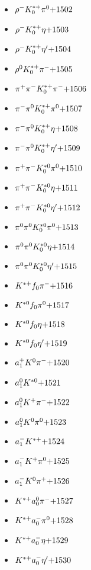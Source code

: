 \begin{multicols}{3}
\begin{itemize}
 \item $ \rho^{-} K_{0}^{*+} \pi^{0} \hfill{+1502}$
 \item $ \rho^{-} K_{0}^{*+} \eta \hfill{+1503}$
 \item $ \rho^{-} K_{0}^{*+} {\eta^{\prime}} \hfill{+1504}$
 \item $ \rho^{0} K_{0}^{*+} \pi^{-} \hfill{+1505}$
 \item $ \pi^{+} \pi^{-} K_{0}^{*+} \pi^{-} \hfill{+1506}$
 \item $ \pi^{-} \pi^{0} K_{0}^{*+} \pi^{0} \hfill{+1507}$
 \item $ \pi^{-} \pi^{0} K_{0}^{*+} \eta \hfill{+1508}$
 \item $ \pi^{-} \pi^{0} K_{0}^{*+} {\eta^{\prime}} \hfill{+1509}$
 \item $ \pi^{+} \pi^{-} K_{0}^{*0} \pi^{0} \hfill{+1510}$
 \item $ \pi^{+} \pi^{-} K_{0}^{*0} \eta \hfill{+1511}$
 \item $ \pi^{+} \pi^{-} K_{0}^{*0} {\eta^{\prime}} \hfill{+1512}$
 \item $ \pi^{0} \pi^{0} K_{0}^{*0} \pi^{0} \hfill{+1513}$
 \item $ \pi^{0} \pi^{0} K_{0}^{*0} \eta \hfill{+1514}$
 \item $ \pi^{0} \pi^{0} K_{0}^{*0} {\eta^{\prime}} \hfill{+1515}$
 \item $ K^{*+} f_{0} \pi^{-} \hfill{+1516}$
 \item $ K^{*0} f_{0} \pi^{0} \hfill{+1517}$
 \item $ K^{*0} f_{0} \eta \hfill{+1518}$
 \item $ K^{*0} f_{0} {\eta^{\prime}} \hfill{+1519}$
 \item $ a_{1}^{+} K^{0} \pi^{-} \hfill{+1520}$
 \item $ a_{1}^{0} K^{*0} \hfill{+1521}$
 \item $ a_{1}^{0} K^{+} \pi^{-} \hfill{+1522}$
 \item $ a_{1}^{0} K^{0} \pi^{0} \hfill{+1523}$
 \item $ a_{1}^{-} K^{*+} \hfill{+1524}$
 \item $ a_{1}^{-} K^{+} \pi^{0} \hfill{+1525}$
 \item $ a_{1}^{-} K^{0} \pi^{+} \hfill{+1526}$
 \item $ K^{*+} a_{0}^{0} \pi^{-} \hfill{+1527}$
 \item $ K^{*+} a_{0}^{-} \pi^{0} \hfill{+1528}$
 \item $ K^{*+} a_{0}^{-} \eta \hfill{+1529}$
 \item $ K^{*+} a_{0}^{-} {\eta^{\prime}} \hfill{+1530}$

\end{itemize}
\end{multicols}

